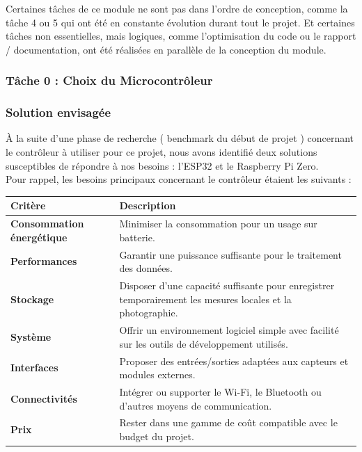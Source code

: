 Certaines tâches de ce module ne sont pas dans l'ordre de conception, comme la tâche 4 ou 5 qui ont été en constante évolution 
durant tout le projet. Et certaines tâches non essentielles, mais logiques, comme l'optimisation du code ou le rapport / documentation, ont 
été réalisées en parallèle de la conception du module.
\\

\subsubsection{Tâche 0 : Choix du Microcontrôleur}

\subsubsection*{Solution envisagée}

À la suite d’une phase de recherche ( benchmark du début de projet ) concernant le contrôleur à utiliser pour ce projet, nous avons identifié deux solutions susceptibles 
de répondre à nos besoins : l’ESP32 et le Raspberry Pi Zero.
\\

Pour rappel, les besoins principaux concernant le contrôleur étaient les suivants :
\\

\begin{center}
\renewcommand{\arraystretch}{1.3}
\begin{tabularx}{0.9\textwidth}{>{\bfseries}l|X}
\toprule
\textbf{Critère} & \textbf{Description} \\
\midrule
Consommation énergétique & Minimiser la consommation pour un usage sur batterie. \\ 
Performances & Garantir une puissance suffisante pour le traitement des données. \\ 
Stockage & Disposer d’une capacité suffisante pour enregistrer temporairement les mesures locales et la photographie. \\ 
Système & Offrir un environnement logiciel simple avec facilité sur les outils de développement utilisés. \\ 
Interfaces & Proposer des entrées/sorties adaptées aux capteurs et modules externes. \\ 
Connectivités & Intégrer ou supporter le Wi-Fi, le Bluetooth ou d'autres moyens de communication. \\ 
Prix & Rester dans une gamme de coût compatible avec le budget du projet. \\ 
\bottomrule
\end{tabularx}
\end{center}

